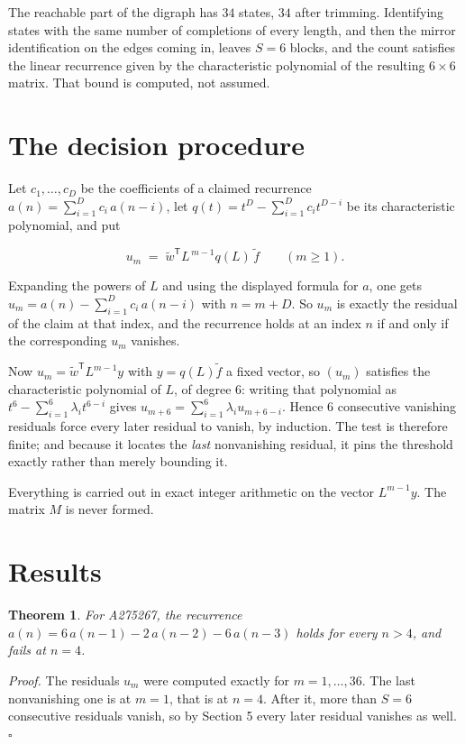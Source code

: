\documentclass[11pt]{article}
\newtheorem{theorem}{Theorem}
\theoremstyle{definition}
\begin{document}
The reachable part of the digraph has $34$ states, $34$ after trimming. Identifying states with the same number of completions of every length, and then the mirror identification on the edges coming in, leaves $S = 6$ blocks, and the count satisfies the linear recurrence given by the characteristic polynomial of the resulting $6\times6$ matrix. That bound is computed, not assumed.

\section{The decision procedure}

Let $c_1,\dots,c_D$ be the coefficients of a claimed recurrence $a(n) = \sum_{i=1}^{D} c_i\,a(n-i)$, let $q(t) = t^{D} - \sum_{i=1}^{D} c_i t^{D-i}$ be its characteristic polynomial, and put

\[u_m \;=\; \tilde w^{\mathsf T} L^{\,m-1} q(L)\,\tilde f \qquad (m \ge 1).\]

Expanding the powers of $L$ and using the displayed formula for $a$, one gets $u_m = a(n) - \sum_{i=1}^{D} c_i\,a(n-i)$ with $n = m + D$. So $u_m$ is exactly the residual of the claim at that index, and the recurrence holds at an index $n$ if and only if the corresponding $u_m$ vanishes.

Now $u_m = \tilde w^{\mathsf T} L^{m-1} y$ with $y = q(L)\tilde f$ a fixed vector, so $(u_m)$ satisfies the characteristic polynomial of $L$, of degree $6$: writing that polynomial as $t^{6} - \sum_{i=1}^{6} \lambda_i t^{6-i}$ gives $u_{m+6} = \sum_{i=1}^{6} \lambda_i u_{m+6-i}$. Hence $6$ consecutive vanishing residuals force every later residual to vanish, by induction. The test is therefore finite; and because it locates the {\itshape last} nonvanishing residual, it pins the threshold exactly rather than merely bounding it.

Everything is carried out in exact integer arithmetic on the vector $L^{m-1}y$. The matrix $M$ is never formed.

\section{Results}

\begin{theorem} For A275267, the recurrence $a(n) = 6\,a(n-1) - 2\,a(n-2) - 6\,a(n-3)$ holds for every $n > 4$, and fails at $n = 4$.\end{theorem}

{\itshape Proof.} The residuals $u_m$ were computed exactly for $m = 1,\dots,36$. The last nonvanishing one is at $m = 1$, that is at $n = 4$. After it, more than $S = 6$ consecutive residuals vanish, so by Section 5 every later residual vanishes as well. $\square$
\end{document}
